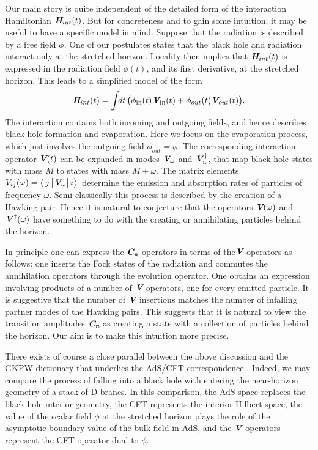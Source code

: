 \documentclass[12pt]{article}%
\def\spc{\hspace{.5pt}}
\def\be{\begin{equation}}
\def\ee{\end{equation}}
\begin{document}
Our main story is quite independent of the detailed form of the interaction Hamiltonian $\textit{\textbf H}_{int}(t)$. But for concreteness and to gain some intuition, it may be useful to have a specific model in mind. Suppose that the radiation is described by a free field $\phi$. One of our postulates states that the black hole and radiation interact only at the stretched horizon. Locality then implies that $\textit{\textbf H}_{int}(t)$ is expressed in the radiation field $\phi(t)$, and its first derivative, at the stretched horizon. This leads to a simplified model of the form 
\be
\hH_{int}(t) = \int \!\! dt \, \bigl(\phi_{\rm in} (t)\spc \vV_{\rm in}(t) + \phi_{out}(t) \vV_{out}(t)\bigrr). 
\ee
The interaction contains both incoming and outgoing fields, and hence describes black hole formation and evaporation.  Here we focus on the evaporation process, which just involves the outgoing field $\phi_{out} = \phi$. 
The corresponding interaction operator $\mbox{\textit{\textbf{V}\!\,}}(t)$ can be expanded in modes $\mbox{\textit{\textbf{V}\!\,}}_\omega$ and $\mbox{\textit{\textbf{V}\!\,}}^{\,\dagger}_\omega$, that map black hole states with mass $M$ to states with mass $M\pm\omega$. The matrix elements
$
V_{ij}(\omega)= \bigl\langle\, j\,\bigr|  \mbox{\textit{\textbf{V}\!\,}}_\omega\bigl|\, i \bigr\rangle\, 
$ determine the emission and absorption rates of particles of frequency $\omega$. Semi-classically this process is described by the creation of a Hawking pair. Hence it is natural to conjecture that the operators $\mbox{\textit{\textbf{V}\!\,}}(\omega)$ and $\mbox{\textit{\textbf{V}\!\,}}^{\,\dagger}(\omega)$ have something to do with the creating or annihilating particles behind the horizon. 




In principle one can express the $\mbox{\textit{\textbf{C}\!\,}}_{{ \textit{\textbf n}}}$ operators in terms of the$\mbox{\textit{\textbf{V}\!\,}}$ operators as follows: one inserts the Fock states of the radiation and commutes the annihilation operators through the evolution operator. One obtains an expression involving products of a number of $\mbox{\textit{\textbf{V}\!\,}}$ operators, one for every emitted particle. It is suggestive that the number of $\mbox{\textit{\textbf{V}\!\,}}$ insertions matches the number of  infalling partner modes of the Hawking pairs.  This suggests that it is natural to view the transition amplitudes $\mbox{\textit{\textbf{C}\!\,}}_{{ \textit{\textbf n}}}$ as creating a state with a collection of particles behind the horizon.  Our aim is to make this intuition more
precise. 

There exists of course a close parallel between the above discussion and the GKPW dictionary that underlies the AdS/CFT correspondence \cite{maldacena}. 
Indeed, we may compare
the process of falling into a black hole with entering  the near-horizon geometry of a stack of D-branes. In this comparison, the AdS space replaces the black hole interior
geometry, the CFT represents the interior Hilbert space, the value of the scalar field 
$\phi$ at the stretched horizon plays the role of the asymptotic boundary value of the bulk field in AdS, and the $\mbox{\textit{\textbf{V}\!\,}}$ operators represent the CFT operator dual to $\phi$. 
\end{document}
